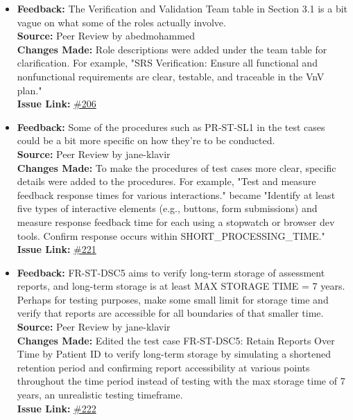 \documentclass{article}
\begin{document}
\begin{itemize}
    \item 
      \textbf{Feedback:} The Verification and Validation Team table in Section 3.1 is a bit vague on what some of the roles actually involve. \\
      \textbf{Source:} Peer Review by abedmohammed \\
      \textbf{Changes Made:} Role descriptions were added under the team table for clarification. For example, "SRS Verification: Ensure all functional and nonfunctional requirements are clear, testable, and traceable in the VnV plan."\\
      \textbf{Issue Link:} \href{https://github.com/parishanizam/TeleHealth/issues/206}{\#206}

    \item 
      \textbf{Feedback:} Some of the procedures such as PR-ST-SL1 in the test cases could be a bit more specific on how they're to be conducted. \\
      \textbf{Source:} Peer Review by jane-klavir \\
      \textbf{Changes Made:} To make the procedures of test cases more clear, specific details were added to the procedures. For example, "Test and measure feedback response times for various interactions." became "Identify at least five types of interactive elements (e.g., buttons, form submissions) and measure response feedback time for each using a stopwatch or browser dev tools. Confirm response occurs within SHORT\_PROCESSING\_TIME."\\
      \textbf{Issue Link:} \href{https://github.com/parishanizam/TeleHealth/issues/221}{\#221}

    \item 
      \textbf{Feedback:} FR-ST-DSC5 aims to verify long-term storage of assessment reports, and long-term storage is at least MAX STORAGE TIME = 7 years. Perhaps for testing purposes, make some small limit for storage time and verify that reports are accessible for all boundaries of that smaller time. \\
      \textbf{Source:} Peer Review by jane-klavir \\
      \textbf{Changes Made:} Edited the test case FR-ST-DSC5: Retain Reports Over Time by Patient ID to verify long-term storage by simulating a shortened retention period and confirming report accessibility at various points throughout the time period instead of testing with the max storage time of 7 years, an unrealistic testing timeframe.\\
      \textbf{Issue Link:} \href{https://github.com/parishanizam/TeleHealth/issues/222}{\#222}
      

\end{itemize}
\end{document}
